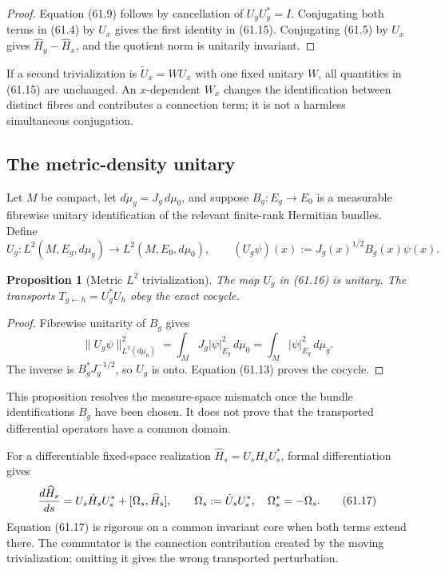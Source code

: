 \documentclass[11pt]{article}
\newtheorem{proposition}[theorem]{Proposition}
\theoremstyle{remark}
\begin{document}
\begin{proof}
Equation (61.9) follows by cancellation of \(U_yU_y^*=I\).
Conjugating both terms in (61.4) by \(U_x\) gives the first identity
in (61.15).  Conjugating (61.5) by \(U_x\) gives
\(\widehat H_y-\widehat H_x\), and the quotient norm is unitarily
invariant.
\end{proof}

If a second trivialization is
\(\widetilde U_x=WU_x\) with one fixed unitary \(W\), all quantities
in (61.15) are unchanged.  An \(x\)-dependent \(W_x\) changes the
identification between distinct fibres and contributes a connection
term; it is not a harmless simultaneous conjugation.

\subsection{The metric-density unitary}

Let \(M\) be compact, let \(d\mu_g=J_g\,d\mu_0\), and suppose
\(B_g:E_g\to E_0\) is a measurable fibrewise unitary identification
of the relevant finite-rank Hermitian bundles.  Define
\begin{equation}
 U_g:L^2(M,E_g,d\mu_g)\longrightarrow
     L^2(M,E_0,d\mu_0),
 \qquad
 (U_g\psi)(x):=J_g(x)^{1/2}B_g(x)\psi(x).          \tag{61.16}
\end{equation}

\begin{proposition}[Metric \(L^2\) trivialization]
\label{prop:v12v61-metric-unitary}
The map \(U_g\) in (61.16) is unitary.  The transports
\(T_{g\leftarrow h}=U_g^*U_h\) obey the exact cocycle.
\end{proposition}

\begin{proof}
Fibrewise unitarity of \(B_g\) gives
\[
 \|U_g\psi\|_{L^2(d\mu_0)}^2
 =
 \int_M J_g|\psi|_{E_g}^2\,d\mu_0
 =
 \int_M|\psi|_{E_g}^2\,d\mu_g.
\]
The inverse is \(B_g^*J_g^{-1/2}\), so \(U_g\) is onto.  Equation
(61.13) proves the cocycle.
\end{proof}

This proposition resolves the measure-space mismatch once the bundle
identifications \(B_g\) have been chosen.  It does not prove that
the transported differential operators have a common domain.

For a differentiable fixed-space realization
\(\widehat H_s=U_sH_sU_s^*\), formal differentiation gives
\begin{equation}
 {d\widehat H_s\over ds}
 =
 U_s\dot H_sU_s^*
 +
 [\Omega_s,\widehat H_s],
 \qquad
 \Omega_s:=\dot U_sU_s^*,\quad\Omega_s^*=-\Omega_s.           \tag{61.17}
\end{equation}
Equation (61.17) is rigorous on a common invariant core when both
terms extend there.  The commutator is the connection contribution
created by the moving trivialization; omitting it gives the wrong
transported perturbation.
\end{document}
